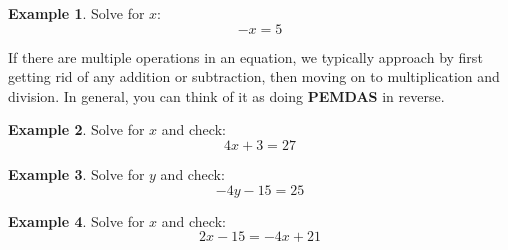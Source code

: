 \documentclass[addpoints,12pt]{exam}
\theoremstyle{definition}
\theoremstyle{break}
\theoremstyle{break}
\newtheorem{example}{Example}[subsection]
\begin{document}
\begin{example}
Solve for $x$: \[-x = 5\]

\end{example}

\newpage

\noindent If there are multiple operations in an equation, we typically approach by first getting rid of any addition or subtraction, then moving on to multiplication and division. In general, you can think of it as doing \textbf{PEMDAS} in reverse.

\vspace{.15in}

\begin{example}
Solve for $x$ and check: \[4x + 3 = 27\]
\vspace{1.5in}
\end{example}

\begin{example}
Solve for $y$ and check: \[-4y - 15 = 25\]
\vspace{1.5in}
\end{example}

\begin{example}
Solve for $x$ and check: \[2x - 15 = -4x + 21\]
\end{example}
\end{document}
